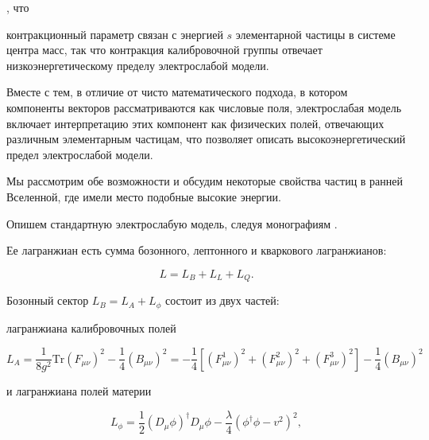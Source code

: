 \cite{gromov:Gr-2012, gromov:Gr-2013}, что

контракционный параметр связан с энергией $s$ элементарной частицы в системе центра масс, так что контракция калибровочной группы отвечает низкоэнергетическому пределу электрослабой модели.

Вместе с тем, в отличие от чисто математического подхода, в котором компоненты векторов рассматриваются как числовые поля, электрослабая модель включает  интерпретацию этих компонент как физических полей, отвечающих различным элементарным частицам, что позволяет описать  высокоэнергетический предел электрослабой модели.

Мы рассмотрим обе возможности и обсудим некоторые свойства частиц в ранней Вселенной, где имели место подобные высокие энергии.



\smallskip





Опишем стандартную электрослабую модель, следуя монографиям \cite{gromov:R-99, gromov:PS-95}. 

Ее лагранжиан есть сумма бозонного, лептонного и кваркового лагранжианов:

\begin{equation}

L=L_B + L_L + L_Q.


\label{gr:eq:eq1}

\end{equation}

Бозонный сектор  $L_B=L_A + L_{\phi}$ состоит из двух частей: 

лагранжиана калибровочных полей

 \begin{equation}

L_A=\frac{1}{8g^2}\mbox{Tr}(F_{\mu\nu})^2 -\frac{1}{4}(B_{\mu\nu})^2=   -\frac{1}{4}[(F_{\mu\nu}^1)^2 +(F_{\mu\nu}^2)^2+(F_{\mu\nu}^3)^2] -\frac{1}{4}(B_{\mu\nu})^2

\label{gr:eq:eq2}

\end{equation}

и лагранжиана полей материи

\begin{equation}

  L_{\phi}= \frac{1}{2}(D_\mu \phi)^{\dagger}D_\mu \phi -

  \frac{\lambda }{4}\left(\phi^{\dagger}\phi- v^2\right)^2,

\label{gr:eq:eq3}

\end{equation}

